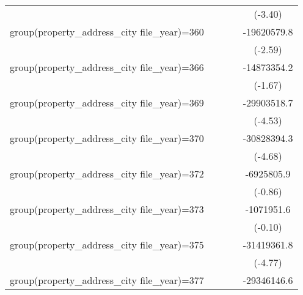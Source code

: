 {\begin{tabular}{l*{4}{c}}
                    &                     &                     &                     &     (-3.40)         \\
\addlinespace
group(property\_address\_city file\_year)=360&                     &                     &                     & -19620579.8\sym{**} \\
                    &                     &                     &                     &     (-2.59)         \\
\addlinespace
group(property\_address\_city file\_year)=366&                     &                     &                     & -14873354.2         \\
                    &                     &                     &                     &     (-1.67)         \\
\addlinespace
group(property\_address\_city file\_year)=369&                     &                     &                     & -29903518.7\sym{***}\\
                    &                     &                     &                     &     (-4.53)         \\
\addlinespace
group(property\_address\_city file\_year)=370&                     &                     &                     & -30828394.3\sym{***}\\
                    &                     &                     &                     &     (-4.68)         \\
\addlinespace
group(property\_address\_city file\_year)=372&                     &                     &                     &  -6925805.9         \\
                    &                     &                     &                     &     (-0.86)         \\
\addlinespace
group(property\_address\_city file\_year)=373&                     &                     &                     &  -1071951.6         \\
                    &                     &                     &                     &     (-0.10)         \\
\addlinespace
group(property\_address\_city file\_year)=375&                     &                     &                     & -31419361.8\sym{***}\\
                    &                     &                     &                     &     (-4.77)         \\
\addlinespace
group(property\_address\_city file\_year)=377&                     &                     &                     & -29346146.6\sym{***}\\

\end{tabular}}
